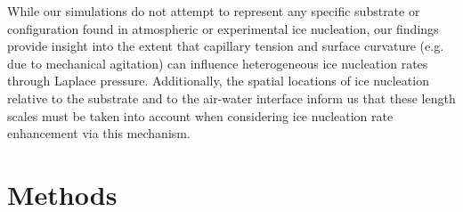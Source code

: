 \documentclass[journal abbreviation, manuscript]{copernicus}
\providecommand{\DIFadd}[1]{{\protect\color{blue}\uwave{#1}}} %
\providecommand{\DIFaddbegin}{} %
\providecommand{\DIFaddend}{} %
\begin{document}
While our simulations do not attempt to represent any specific substrate or configuration found in atmospheric or experimental ice nucleation, our findings provide insight into the extent that capillary tension and surface curvature (e.g. due to mechanical agitation) can influence heterogeneous ice nucleation rates through \DIFaddbegin \DIFadd{negative }\DIFaddend Laplace pressure.  Additionally, the spatial locations of ice nucleation relative to the substrate and to the air-water interface inform us that these length scales must be taken into account when considering ice nucleation rate enhancement via this mechanism.








\section{Methods}
\end{document}

